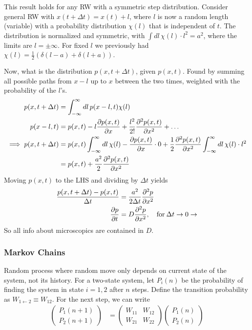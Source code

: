 \documentclass[a4paper, english, 12pt]{article}
\begin{document}
\begin{multicols*}{2}
This result holds for any RW with a symmetric step distribution. Consider general RW with $x(t+\Delta t)=x(t)+l$, where $l$ is now a random length (variable) with a probability distribution $\chi(l)$ that is independent of $t$. The distribution is normalized and symmetric, with $\int dl\,\chi(l)\cdot l^2=a^2$, where the limits are $l=\pm\infty$. For fixed $l$ we previously had $\chi(l)=\frac{1}{2}(\delta(l-a) + \delta(l+a))$. 

Now, what is the distribution $p(x,t+\Delta t)$, given $p(x,t)$. Found by summing all possible paths from $x-l$ up to $x$ between the two times, weighted with the probability of the $l$'s. 
\begin{align*}
    p(x,t+\Delta t) &= \int_{-\infty}^\infty dl\, p(x-l,t)\chi(l) \\ 
    p(x-l,t) &= p(x,t) - l \pdv{p(x,t)}{x} + \frac{l^2}{2!}\pdv[2]{p(x,t)}{x} + \dots \\ 
    \implies p(x,t+\Delta t) &= p(x,t)\int_{-\infty}^\infty dl\,\chi(l) - \pdv{p(x,t)}{x} \cdot 0 + \frac{1}{2} \pdv[2]{p(x,t)}{x} \int_{-\infty}^\infty dl\,\chi(l)\cdot l^2 \\ 
    &= p(x,t) + \frac{a^2}{2} \pdv[2]{p(x,t)}{x}
\end{align*}
Moving $p(x,t)$ to the LHS and dividing by $\Delta t$ yields 
\begin{align*}
    \frac{p(x,t+\Delta t) - p(x,t)}{\Delta t} &= \frac{a^2}{2\Delta t} \pdv[2]{p}{x} \\ 
    \pdv{p}{t} &= D \pdv[2]{p}{x},\quad \text{for}\: \Delta t \to 0 \to
\end{align*}
So all info about microscopics are contained in $D$. 



\subsubsection*{Markov Chains}
Random process where random move only depends on current state of the system, not its history. For a two-state system, let $P_i(n)$ be the probability of finding the system in state $i=1,2$ after $n$ steps. Define the transition probability as $W_{1\gets2}\equiv W_{12}$. For the next step, we can write 
\begin{align*}
    \begin{pmatrix}
        P_1 (n+1) \\
        P_2 (n+1)
    \end{pmatrix}
    &= \begin{pmatrix}
        W_{11} & W_{12} \\ 
        W_{21} & W_{22}
    \end{pmatrix}
    \begin{pmatrix}
        P_1 (n) \\
        P_2 (n)
    \end{pmatrix}
\end{align*}


\end{multicols*}
\end{document}
